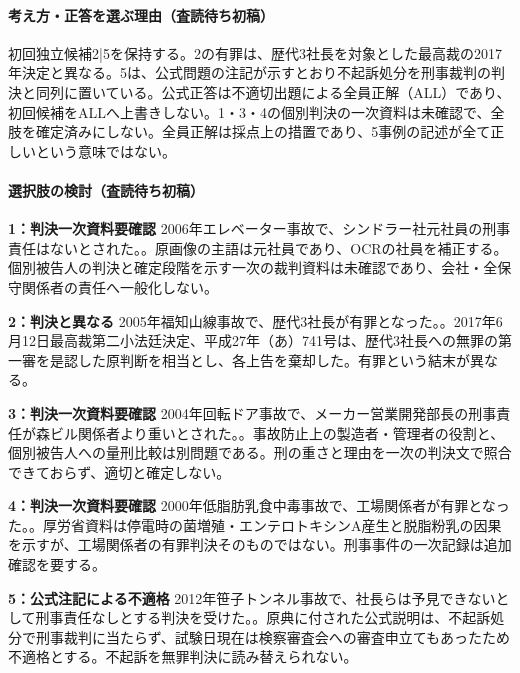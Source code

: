 \paragraph{考え方・正答を選ぶ理由（査読待ち初稿）} 初回独立候補2|5を保持する。2の有罪は、歴代3社長を対象とした最高裁の2017年決定と異なる。5は、公式問題の注記が示すとおり不起訴処分を刑事裁判の判決と同列に置いている。公式正答は不適切出題による全員正解（ALL）であり、初回候補をALLへ上書きしない。1・3・4の個別判決の一次資料は未確認で、全肢を確定済みにしない。全員正解は採点上の措置であり、5事例の記述が全て正しいという意味ではない。

\paragraph{選択肢の検討（査読待ち初稿）}\mbox{}\par

\noindent\textbf{1：判決一次資料要確認} 2006年エレベーター事故で、シンドラー社元社員の刑事責任はないとされた。。原画像の主語は元社員であり、OCRの社員を補正する。個別被告人の判決と確定段階を示す一次の裁判資料は未確認であり、会社・全保守関係者の責任へ一般化しない。\par

\noindent\textbf{2：判決と異なる} 2005年福知山線事故で、歴代3社長が有罪となった。。2017年6月12日最高裁第二小法廷決定、平成27年（あ）741号は、歴代3社長への無罪の第一審を是認した原判断を相当とし、各上告を棄却した。有罪という結末が異なる。\par

\noindent\textbf{3：判決一次資料要確認} 2004年回転ドア事故で、メーカー営業開発部長の刑事責任が森ビル関係者より重いとされた。。事故防止上の製造者・管理者の役割と、個別被告人への量刑比較は別問題である。刑の重さと理由を一次の判決文で照合できておらず、適切と確定しない。\par

\noindent\textbf{4：判決一次資料要確認} 2000年低脂肪乳食中毒事故で、工場関係者が有罪となった。。厚労省資料は停電時の菌増殖・エンテロトキシンA産生と脱脂粉乳の因果を示すが、工場関係者の有罪判決そのものではない。刑事事件の一次記録は追加確認を要する。\par

\noindent\textbf{5：公式注記による不適格} 2012年笹子トンネル事故で、社長らは予見できないとして刑事責任なしとする判決を受けた。。原典に付された公式説明は、不起訴処分で刑事裁判に当たらず、試験日現在は検察審査会への審査申立てもあったため不適格とする。不起訴を無罪判決に読み替えられない。\par

